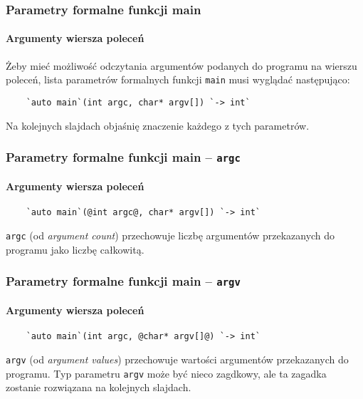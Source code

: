 \documentclass[aspectratio=169]{beamer}
\begin{document}
\begin{frame}[fragile]
    \frametitle{Parametry formalne funkcji main}
    \framesubtitle{Argumenty wiersza poleceń}

    Żeby mieć możliwość odczytania argumentów podanych do programu na wierszu
    poleceń, lista parametrów formalnych funkcji {\tt main} musi wyglądać
    następująco:

    \vspace{1em}
    \begin{lstlisting}
    `auto main`(int argc, char* argv[]) `-> int`
    \end{lstlisting}
    \vspace{1em}

    Na kolejnych slajdach objaśnię znaczenie każdego z tych parametrów.
\end{frame}

\begin{frame}[fragile]
    \frametitle{Parametry formalne funkcji main -- {\tt argc}}
    \framesubtitle{Argumenty wiersza poleceń}

    \begin{lstlisting}
    `auto main`(@int argc@, char* argv[]) `-> int`
    \end{lstlisting}

    {\tt argc} (od \emph{argument count}) przechowuje liczbę argumentów
    przekazanych do programu jako liczbę całkowitą.
\end{frame}

\begin{frame}[fragile]
    \frametitle{Parametry formalne funkcji main -- {\tt argv}}
    \framesubtitle{Argumenty wiersza poleceń}

    \begin{lstlisting}
    `auto main`(int argc, @char* argv[]@) `-> int`
    \end{lstlisting}

    {\tt argv} (od \emph{argument values}) przechowuje wartości argumentów
    przekazanych do programu. Typ parametru {\tt argv} może być nieco zagdkowy,
    ale ta zagadka zostanie rozwiązana na kolejnych slajdach.
\end{frame}
\end{document}
